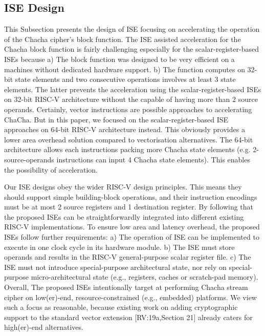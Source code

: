 \subsection{ISE Design}

This Subsection presents the design of ISE focusing on accelerating the operation of the Chacha cipher's block function. 
The ISE assisted acceleration for the Chacha block function is fairly challenging especially for the scalar-register-based ISEs because 
a) The block function was designed to be very efficient on a machines without dedicated hardware support. 
b) The function computes on 32-bit state elements and two consecutive operations involves at least 3 state elements. 
The latter prevents the acceleration using the scalar-register-based ISEs on 32-bit RISC-V architecture without the capable of having more than 2 source operands.
Certainly, vector instructions are possible approaches to accelerating ChaCha. 
But in this paper, we focused on the scalar-register-based ISE approaches on 64-bit RISC-V architecture instead. 
This obviously provides a lower area overhead solution compared to vectorisation alternatives. 
The 64-bit architecture allows each instructions packing more Chacha state elements (e.g. 2-source-operands instructions can input 4 Chacha state elements). 
This enables the possibility of acceleration.

Our ISE designs obey the wider RISC-V design principles. 
This means they should support simple building-block operations, and their instruction encodings must be at most 2 source registers and 1 destination register. 
By following that the proposed ISEs can be straightforwardly integrated into different existing RISC-V implementations.
To ensure low area and latency overhead, the proposed ISEs follow further requirements: 
a) The operation of ISE can be implemented to execute in one clock cycle in its hardware module. 
b) The ISE must store operands and results in the RISC-V general-purpose scalar register file. 
c) The ISE must not introduce special-purpose architectural state, nor rely on special-purpose micro-architectural state (e.g., registers, caches or scratch-pad memory).
Overall, The proposed ISEs intentionally target at performing Chacha stream cipher on low(er)-end, resource-constrained (e.g., embedded) platforms. We view such a focus as reasonable, because existing work on adding cryptographic support to the standard vector extension [RV:19a,Section 21] already caters for high(er)-end alternatives. 

